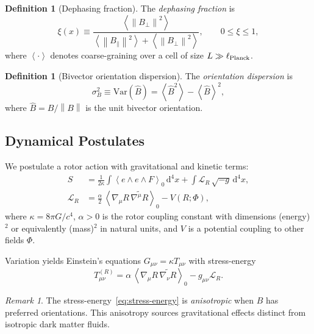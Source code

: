 \documentclass[11pt,a4paper]{article}
\numberwithin{equation}{section}
\theoremstyle{plain}
\theoremstyle{definition}
\newtheorem{definition}[theorem]{Definition}
\theoremstyle{remark}
\newtheorem{remark}[theorem]{Remark}
\newcommand{\Var}{\mathrm{Var}}
\newcommand{\dd}{\mathrm{d}}
\newcommand{\norm}[1]{\left\lVert#1\right\rVert}
\newcommand{\avg}[1]{\left\langle #1 \right\rangle}
\newcommand{\rev}[1]{\widetilde{#1}}        %
\newcommand{\grade}[2]{\left\langle #1 \right\rangle_{#2}}
\newcommand{\Lag}{\mathcal{L}}              %
\begin{document}
\begin{definition}[Dephasing fraction]
The \emph{dephasing fraction} is
\begin{equation}
\xi(x) \equiv \frac{\avg{ \norm{B_\perp}^2 }}{\avg{ \norm{B_\parallel}^2 }+\avg{ \norm{B_\perp}^2 }},
\qquad 0\le\xi\le 1,
\label{eq:xi-def}
\end{equation}
where $\avg{\cdot}$ denotes coarse-graining over a cell of size $L\gg \ell_{\rm Planck}$.
\end{definition}

\begin{definition}[Bivector orientation dispersion]
The \emph{orientation dispersion} is
\begin{equation}
\sigma_B^2 \equiv \Var(\hat B) = \avg{\hat B^2} - \avg{\hat B}^2,
\end{equation}
where $\hat B = B/\norm{B}$ is the unit bivector orientation.
\end{definition}

\subsection{Dynamical Postulates}

We postulate a rotor action with gravitational and kinetic terms:
\begin{align}
S &= \frac{1}{2\kappa}\int \grade{e\wedge e\wedge F}{0}\,\dd^4x
    + \int \Lag_R\,\sqrt{-g}\,\dd^4x,
\label{eq:action}\\
\Lag_R &= \frac{\alpha}{2}\,\grade{\nabla_\mu R\,\rev{\nabla^\mu R}}{0}-V(R;\Phi),
\label{eq:lagrangian-rotor}
\end{align}
where $\kappa=8\pi G/c^4$, $\alpha>0$ is the rotor coupling constant with dimensions (energy)$^2$ or equivalently (mass)$^2$ in natural units, and $V$ is a potential coupling to other fields $\Phi$.

Variation yields Einstein's equations $G_{\mu\nu}=\kappa T_{\mu\nu}$ with stress-energy
\begin{equation}
T^{(R)}_{\mu\nu}=\alpha\,\grade{\nabla_\mu R\,\rev{\nabla_\nu R}}{0}-g_{\mu\nu}\Lag_R.
\label{eq:stress-energy}
\end{equation}

\begin{remark}
The stress-energy~\eqref{eq:stress-energy} is \emph{anisotropic} when $B$ has preferred orientations. This anisotropy sources gravitational effects distinct from isotropic dark matter fluids.
\end{remark}
\end{document}
